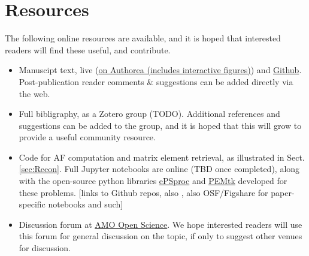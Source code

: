 \section{Resources\label{sec:resources}}

The following online resources are available, and it is hoped that interested readers will find these useful, and contribute.

\begin{itemize}
\item Manuscipt text, live (\href{https://www.authorea.com/users/71114/articles/447808-extracting-molecular-frame-photoionization-dynamics-from-experimental-data}{on Authorea (includes interactive figures)}) and \href{https://github.com/phockett/Extracting-Molecular-Frame-Photoionization-Dynamics-from-Experimental-Data}{Github}. Post-publication reader comments \& suggestions can be added directly via the web.
\item Full bibligraphy, as a Zotero group (TODO). Additional references and suggestions can be added to the group, and it is hoped that this will grow to provide a useful community resource.
\item Code for AF computation and matrix element retrieval, as illustrated in Sect. \ref{sec:Recon}. Full Jupyter notebooks are online (TBD once completed), along with the open-source python libraries \href{https://epsproc.readthedocs.io}{ePSproc} and \href{https://pemtk.readthedocs.io}{PEMtk} developed for these problems. [links to Github repos, also \cite{ePSprocAuthorea,ePSprocFigshare,ePSprocGithub}, also OSF/Figshare for paper-specific notebooks and such]
\item Discussion forum at \href{https://amoopenscience.femtolab.ca/}{AMO Open Science}. We hope interested readers will use this forum for general discussion on the topic, if only to suggest other venues for discussion.
\end{itemize}